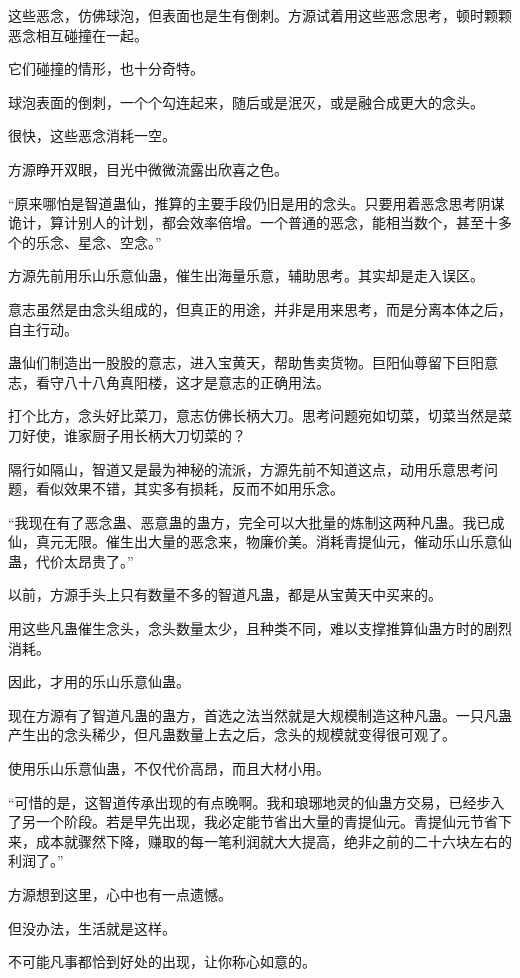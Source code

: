 \begin{this_body}
这些恶念，仿佛球泡，但表面也是生有倒刺。方源试着用这些恶念思考，顿时颗颗恶念相互碰撞在一起。

它们碰撞的情形，也十分奇特。

球泡表面的倒刺，一个个勾连起来，随后或是泯灭，或是融合成更大的念头。

很快，这些恶念消耗一空。

方源睁开双眼，目光中微微流露出欣喜之色。

“原来哪怕是智道蛊仙，推算的主要手段仍旧是用的念头。只要用着恶念思考阴谋诡计，算计别人的计划，都会效率倍增。一个普通的恶念，能相当数个，甚至十多个的乐念、星念、空念。”

方源先前用乐山乐意仙蛊，催生出海量乐意，辅助思考。其实却是走入误区。

意志虽然是由念头组成的，但真正的用途，并非是用来思考，而是分离本体之后，自主行动。

蛊仙们制造出一股股的意志，进入宝黄天，帮助售卖货物。巨阳仙尊留下巨阳意志，看守八十八角真阳楼，这才是意志的正确用法。

打个比方，念头好比菜刀，意志仿佛长柄大刀。思考问题宛如切菜，切菜当然是菜刀好使，谁家厨子用长柄大刀切菜的？

隔行如隔山，智道又是最为神秘的流派，方源先前不知道这点，动用乐意思考问题，看似效果不错，其实多有损耗，反而不如用乐念。

“我现在有了恶念蛊、恶意蛊的蛊方，完全可以大批量的炼制这两种凡蛊。我已成仙，真元无限。催生出大量的恶念来，物廉价美。消耗青提仙元，催动乐山乐意仙蛊，代价太昂贵了。”

以前，方源手头上只有数量不多的智道凡蛊，都是从宝黄天中买来的。

用这些凡蛊催生念头，念头数量太少，且种类不同，难以支撑推算仙蛊方时的剧烈消耗。

因此，才用的乐山乐意仙蛊。

现在方源有了智道凡蛊的蛊方，首选之法当然就是大规模制造这种凡蛊。一只凡蛊产生出的念头稀少，但凡蛊数量上去之后，念头的规模就变得很可观了。

使用乐山乐意仙蛊，不仅代价高昂，而且大材小用。

“可惜的是，这智道传承出现的有点晚啊。我和琅琊地灵的仙蛊方交易，已经步入了另一个阶段。若是早先出现，我必定能节省出大量的青提仙元。青提仙元节省下来，成本就骤然下降，赚取的每一笔利润就大大提高，绝非之前的二十六块左右的利润了。”

方源想到这里，心中也有一点遗憾。

但没办法，生活就是这样。

不可能凡事都恰到好处的出现，让你称心如意的。


\end{this_body}

